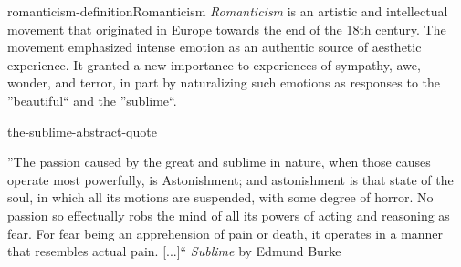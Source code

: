\documentclass[preview]{standalone}
\begin{document}
\genpage

\begin{snippetdefinition}{romanticism-definition}{Romanticism}
    \textit{Romanticism} is an artistic and intellectual movement that originated
    in Europe towards the end of the 18th century.
    The movement emphasized intense emotion as an authentic source of aesthetic experience.
    It granted a new importance to experiences of sympathy, awe, wonder, and terror,
    in part by naturalizing such emotions as responses to the ''beautiful`` and the ''sublime``.
\end{snippetdefinition}


\begin{snippet}{the-sublime-abstract-quote}
\begin{displayquote}
''The passion caused by the great and sublime in nature, when those causes operate most powerfully, is Astonishment; and astonishment is that state of the soul, in which all its motions are suspended, with some degree of horror. No passion so effectually robs the mind of all its powers of acting and reasoning as fear. For fear being an apprehension of pain or death, it operates in a manner that resembles actual pain. [...]``
\textit{Sublime} by Edmund Burke
\end{displayquote}
\end{snippet}
\end{document}
